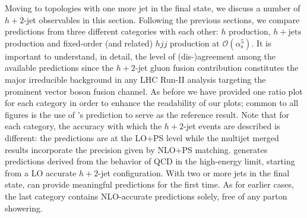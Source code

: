 Moving to topologies with one more jet in the final state, 
we discuss a number of $h+2$-jet
observables in this section. Following the previous sections, we compare predictions from three
different categories with each other: \NNLOPS $h$ production,
\MEPSatNLO $h+\text{jets}$ production and fixed-order (and related)
$hjj$ production at $\mathcal{O}(\alpha_\mathrm{s}^5)$. It is important
to understand, in detail, the level of (dis-)agreement among the
available predictions since the $h+2$-jet gluon fusion contribution
constitutes the major irreducible background in any LHC Run-II analysis
targeting the prominent vector boson fusion channel. As before we have
provided one ratio plot for each category in order to enhance the
readability of our plots; common to all figures is the use of \Powheg's
\NNLOPS prediction to serve as the reference result. Note that for
each category, the accuracy with which the $h+2$-jet events are
described is different: the \NNLOPS predictions are at the LO+PS level
while the multijet merged results incorporate the precision given by NLO+PS
matching. \Hej generates predictions derived from the behavior of QCD
in the high-energy limit, starting from a LO accurate $h+2$-jet configuration.
With two or more jets in the final state,
\Hej can provide meaningful predictions for the first time. As
for earlier cases, the last category contains NLO-accurate predictions
solely, free of any parton showering.

